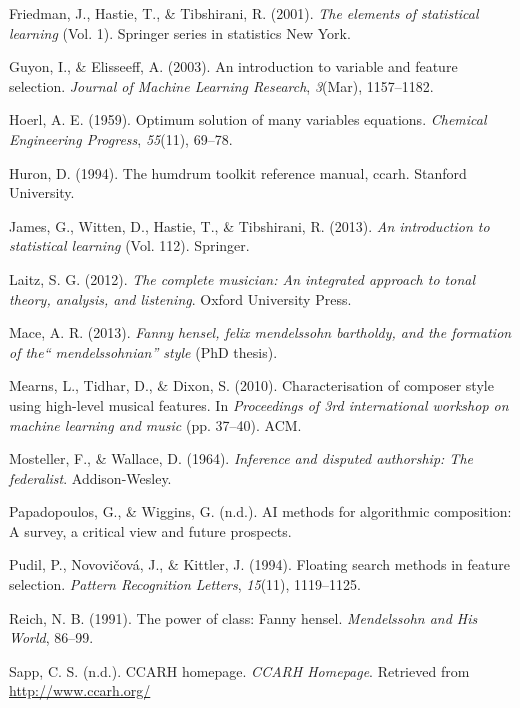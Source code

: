 \documentclass[12pt,twoside]{reedthesis}
\theoremstyle{definition}
\theoremstyle{definition}
\theoremstyle{definition}
\theoremstyle{remark}
\begin{document}
\hypertarget{ref-esl}{}
Friedman, J., Hastie, T., \& Tibshirani, R. (2001). \emph{The elements
of statistical learning} (Vol. 1). Springer series in statistics New
York.

\hypertarget{ref-guyon2003}{}
Guyon, I., \& Elisseeff, A. (2003). An introduction to variable and
feature selection. \emph{Journal of Machine Learning Research},
\emph{3}(Mar), 1157--1182.

\hypertarget{ref-hoer}{}
Hoerl, A. E. (1959). Optimum solution of many variables equations.
\emph{Chemical Engineering Progress}, \emph{55}(11), 69--78.

\hypertarget{ref-huron1994humdrum}{}
Huron, D. (1994). The humdrum toolkit reference manual, ccarh. Stanford
University.

\hypertarget{ref-isl}{}
James, G., Witten, D., Hastie, T., \& Tibshirani, R. (2013). \emph{An
introduction to statistical learning} (Vol. 112). Springer.

\hypertarget{ref-laitz}{}
Laitz, S. G. (2012). \emph{The complete musician: An integrated approach
to tonal theory, analysis, and listening}. Oxford University Press.

\hypertarget{ref-mace2013}{}
Mace, A. R. (2013). \emph{Fanny hensel, felix mendelssohn bartholdy, and
the formation of the`` mendelssohnian'' style} (PhD thesis).

\hypertarget{ref-mearns2010}{}
Mearns, L., Tidhar, D., \& Dixon, S. (2010). Characterisation of
composer style using high-level musical features. In \emph{Proceedings
of 3rd international workshop on machine learning and music} (pp.
37--40). ACM.

\hypertarget{ref-mosteller1964inference}{}
Mosteller, F., \& Wallace, D. (1964). \emph{Inference and disputed
authorship: The federalist}. Addison-Wesley.

\hypertarget{ref-papadopoulosai}{}
Papadopoulos, G., \& Wiggins, G. (n.d.). AI methods for algorithmic
composition: A survey, a critical view and future prospects.

\hypertarget{ref-pudil1994floating}{}
Pudil, P., Novovičová, J., \& Kittler, J. (1994). Floating search
methods in feature selection. \emph{Pattern Recognition Letters},
\emph{15}(11), 1119--1125.

\hypertarget{ref-reich1991}{}
Reich, N. B. (1991). The power of class: Fanny hensel. \emph{Mendelssohn
and His World}, 86--99.

\hypertarget{ref-sapp}{}
Sapp, C. S. (n.d.). CCARH homepage. \emph{CCARH Homepage}. Retrieved
from \url{http://www.ccarh.org/}
\end{document}
